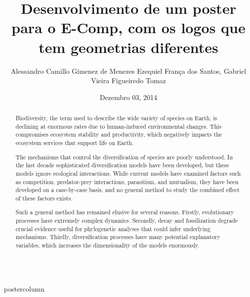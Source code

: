 \documentclass[final,hyperref={pdfpagelabels=false}]{beamer}
\title{\huge Desenvolvimento de um poster para o E-Comp, com os logos que tem geometrias diferentes}
\author{Alessandro Camillo Gimenez de Menezes\inst{1} Ezequiel França dos Santos\inst{1}, Gabriel Vieira Figueiredo Tomaz\inst{1}}
\institute[SENAC]{Centro Universitário Senac - Campus Santo Amaro}
\date[Dezembro 3th, 2014]{Dezembro 03, 2014}
\newlength{\columnheight}
\begin{document}
\begin{frame}
  \begin{columns}%
\begin{column}{.49\textwidth}
      \begin{beamercolorbox}[center,wd=\textwidth]{postercolumn}
        \begin{minipage}[T]{.95\textwidth} %
          \parbox[t][\columnheight]{\textwidth}{ %
            
           \color{blue} %

\begin{abstract}

Biodiversity, the term used to describe the wide variety of species on Earth, is declining at enormous rates due to human-induced environmental changes. This compromises ecosystem stability and productivity, which negatively impacts the ecosystem services that support life on Earth.

The mechanisms that control the diversification of species are poorly understood. In the last decade sophisticated diversification models have been developed, but these models ignore ecological interactions. While current models have examined factors such as competition, predator-prey interactions, parasitism, and mutualism, they have been developed on a case-by-case basis, and no general method to study the combined effect of these factors exists.

Such a general method has remained elusive for several reasons. Firstly, evolutionary processes have extremely complex dynamics. Secondly, decay and fossilization degrade crucial evidence useful for phylogenetic analyses that could infer underlying mechanisms. Thirdly, diversification processes have many potential explanatory variables, which increases the dimensionality of the models enormously.


\end{abstract}}
\end{minipage}
\end{beamercolorbox}
\end{column}
\end{columns}
\end{frame}
\end{document}
